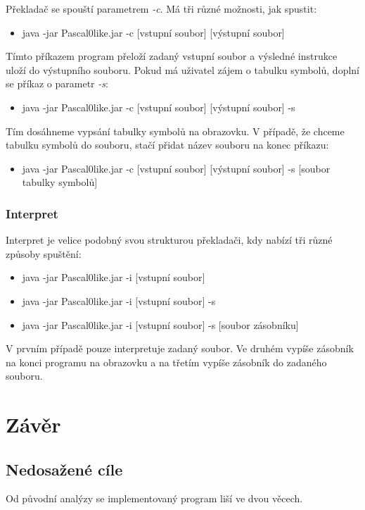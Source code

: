 \documentclass[
12pt,
a4paper,
pdftex,
czech,
titlepage
]{report}
\begin{document}
Překladač se spouští parametrem \textit{-c}. Má tři různé možnosti, jak spustit:
\begin{itemize}
\item java -jar Pascal0like.jar -c [vstupní soubor] [výstupní soubor]
\end{itemize}

Tímto příkazem program přeloží zadaný vstupní soubor a výsledné instrukce uloží do výstupního souboru. Pokud má uživatel zájem o tabulku symbolů, doplní se příkaz o parametr \textit{-s}:
\begin{itemize}
\item java -jar Pascal0like.jar -c [vstupní soubor] [výstupní soubor] -s
\end{itemize}

Tím dosáhneme vypsání tabulky symbolů na obrazovku. V případě, že chceme tabulku symbolů do souboru, stačí přidat název souboru na konec příkazu:
\begin{itemize}
\item java -jar Pascal0like.jar -c [vstupní soubor] [výstupní soubor] -s [soubor tabulky symbolů]
\end{itemize}

\subsection{Interpret}

Interpret je velice podobný svou strukturou překladači, kdy nabízí tři různé způsoby spuštění:
\begin{itemize}
\item java -jar Pascal0like.jar -i [vstupní soubor]
\item java -jar Pascal0like.jar -i [vstupní soubor] -s
\item java -jar Pascal0like.jar -i [vstupní soubor] -s [soubor zásobníku]
\end{itemize}

V prvním případě pouze interpretuje zadaný soubor. Ve druhém vypíše zásobník na konci programu na obrazovku a na třetím vypíše zásobník do zadaného souboru.

\chapter{Závěr}

\section{Nedosažené cíle}
Od původní analýzy se implementovaný program liší ve dvou věcech.
\end{document}
